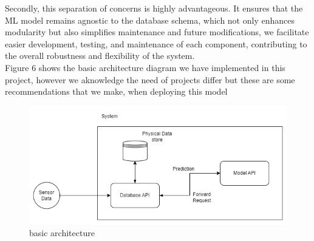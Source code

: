 \documentclass{article}
\begin{document}
Secondly, this separation of concerns is highly advantageous. It ensures that the ML model remains agnostic to the database schema, which not only enhances modularity but also simplifies maintenance and future modifications, we facilitate easier development, testing, and maintenance of each component, contributing to the overall robustness and flexibility of the system. \\

Figure 6 shows the basic architecture diagram we have implemented in this project, however we aknowledge the need of projects differ but these are some recommendations that we make, when deploying this model

\begin{figure}
    \centering
    \includegraphics[width=1\linewidth]{architecture_basic.png}
    \caption{basic architecture}
    \label{fig:architecture}
\end{figure}

\newpage



\end{document}

